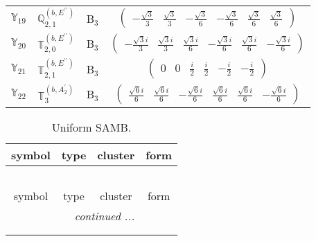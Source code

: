 \documentclass[fleqn,10pt,landscape]{article}
\begin{document}
\begin{itemize}
\begin{center}
\begin{longtable}{c|c|c|c}
$ \mathbb{Y}_{19} $ & $\mathbb{Q}_{2,1}^{(b,E^{\prime\prime})}$ & B$_{3}$ & $\begin{pmatrix} - \frac{\sqrt{3}}{3} & \frac{\sqrt{3}}{3} & - \frac{\sqrt{3}}{6} & - \frac{\sqrt{3}}{6} & \frac{\sqrt{3}}{6} & \frac{\sqrt{3}}{6} \end{pmatrix}$ \\
$ \mathbb{Y}_{20} $ & $\mathbb{T}_{2,0}^{(b,E^{\prime\prime})}$ & B$_{3}$ & $\begin{pmatrix} - \frac{\sqrt{3} i}{3} & \frac{\sqrt{3} i}{3} & \frac{\sqrt{3} i}{6} & - \frac{\sqrt{3} i}{6} & \frac{\sqrt{3} i}{6} & - \frac{\sqrt{3} i}{6} \end{pmatrix}$ \\
$ \mathbb{Y}_{21} $ & $\mathbb{T}_{2,1}^{(b,E^{\prime\prime})}$ & B$_{3}$ & $\begin{pmatrix} 0 & 0 & \frac{i}{2} & \frac{i}{2} & - \frac{i}{2} & - \frac{i}{2} \end{pmatrix}$ \\
$ \mathbb{Y}_{22} $ & $\mathbb{T}_{3}^{(b,A_{2}^{\prime})}$ & B$_{3}$ & $\begin{pmatrix} \frac{\sqrt{6} i}{6} & \frac{\sqrt{6} i}{6} & - \frac{\sqrt{6} i}{6} & \frac{\sqrt{6} i}{6} & \frac{\sqrt{6} i}{6} & - \frac{\sqrt{6} i}{6} \end{pmatrix}$ \\
\end{longtable}
\end{center}
\begin{center}
\renewcommand{\arraystretch}{1.3}
\begin{longtable}{c|c|c|c}
\caption{Uniform SAMB.}
 \\
 \hline \hline
symbol & type & cluster & form \\ \hline \endfirsthead

\multicolumn{3}{l}{\tablename\ \thetable{}} \\
 \hline \hline
symbol & type & cluster & form \\ \hline \endhead

 \hline \hline
\multicolumn{3}{r}{\footnotesize\it continued ...} \\ \endfoot

 \hline \hline
\multicolumn{3}{r}{} \\ \endlastfoot


\end{longtable}
\end{center}
\end{itemize}
\end{document}
